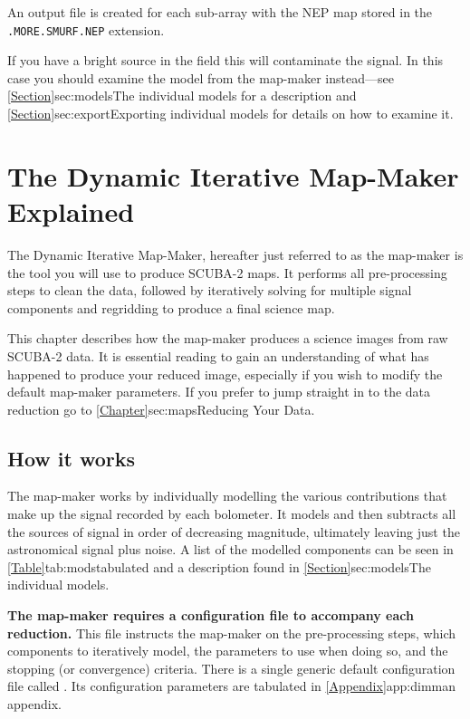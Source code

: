 \documentclass[11pt,oneside,chapters]{starlink}
\begin{document}
An output file is created for each sub-array with the NEP map stored
in the \texttt{.MORE.SMURF.NEP} extension.

If you have a bright source in the field this will
contaminate the signal. In this case you should examine the
 model from the map-maker instead---see
\cref{Section}{sec:models}{The individual models} for a description
and \cref{Section}{sec:export}{Exporting individual models} for
details on how to examine it.

\chapter{The Dynamic Iterative Map-Maker Explained}
\label{sec:dimm}

The Dynamic Iterative Map-Maker, hereafter just referred to as
the map-maker is the tool you will use to produce SCUBA-2 maps. It
performs all pre-processing steps to clean the data, followed by
iteratively solving for multiple signal components and regridding to
produce a final science map.

This chapter describes how the map-maker produces a science images
from raw SCUBA-2 data. It is essential reading to gain an
understanding of what has happened to produce your reduced image,
especially if you wish to modify the default map-maker parameters.
\color{red} If you prefer to jump straight in to the data reduction go
to \cref{Chapter}{sec:maps}{Reducing Your Data}.\color{black}


\section{How it works}

The map-maker works by individually modelling the various
contributions that make up the signal recorded by each bolometer. It
models and then subtracts all the sources of signal in order of
decreasing magnitude, ultimately leaving just the astronomical signal
plus noise. A list of the modelled components can be seen in
\cref{Table}{tab:mods}{tabulated} and a description found in
\cref{Section}{sec:models}{The individual models}.

\textbf{The map-maker requires a configuration file to accompany each
reduction.} This file instructs the map-maker on the pre-processing
steps, which components to iteratively model, the parameters to use
when doing so, and the stopping (or convergence) criteria.
There is a single generic default configuration
file called .  Its configuration parameters are
tabulated in \cref{Appendix}{app:dimm}{an appendix}.
\end{document}
